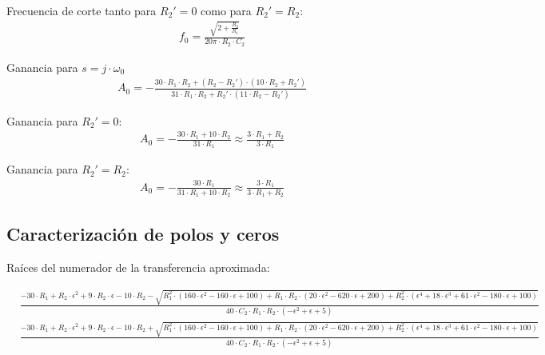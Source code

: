 Frecuencia de corte tanto para $R_2' = 0$ como para $R_2' = R_2$:
\begin{align}
    &f_0 = \frac{\sqrt{2 + \frac{R_2}{R_1}}}{20 \pi \cdot R_2 \cdot C_2}
    \label{eq:ej5_notch_frequency_limit_cases}
\end{align}

Ganancia para $s = j \cdot \omega_0$
\begin{align}
    &A_0 = - \frac{30 \cdot R_1 \cdot R_2 + \left(R_2 - R_2'\right) \cdot \left(10 \cdot R_2 + R_2'\right)}{31 \cdot R_1 \cdot R_2 + R_2' \cdot \left(11 \cdot R_2 - R_2'\right)}
    \label{eq:ej5_system_gain}
\end{align}

Ganancia para $R_2' = 0$:
\begin{align}
    &A_0 = - \frac{30 \cdot R_1 + 10 \cdot R_2}{31 \cdot R_1} \approx \frac{3 \cdot R_1 + R_2}{3 \cdot R_1}
    \label{eq:ej5_system_gain_for_R2'_0}
\end{align}

Ganancia para $R_2' = R_2$:
\begin{align}
    &A_0 = - \frac{30 \cdot R_1}{31 \cdot R_1 + 10 \cdot R_2} \approx \frac{3 \cdot R_1}{3 \cdot R_1 + R_2}
    \label{eq:ej5_system_gain_for_R2'_R2}
\end{align}



\subsection{Caracterización de polos y ceros}
Raíces del numerador de la transferencia aproximada:
\begin{ssmall}
\begin{align}
    &\frac{-30 \cdot R_1 + R_2 \cdot \epsilon^2 + 9 \cdot R_2 \cdot \epsilon - 10 \cdot R_2 - \sqrt{R_1^2 \cdot \left(160 \cdot \epsilon^2 - 160 \cdot \epsilon + 100\right) + R_1 \cdot R_2 \cdot \left(20 \cdot \epsilon^2 - 620 \cdot \epsilon + 200\right) + R_2^2 \cdot \left(\epsilon^4 + 18 \cdot \epsilon^3 + 61 \cdot \epsilon^2 - 180 \cdot \epsilon + 100\right)}}{40 \cdot C_2 \cdot R_1 \cdot R_2 \cdot (-\epsilon^2 + \epsilon + 5)} \\
    &\frac{-30 \cdot R_1 + R_2 \cdot \epsilon^2 + 9 \cdot R_2 \cdot \epsilon - 10 \cdot R_2 + \sqrt{R_1^2 \cdot \left(160 \cdot \epsilon^2 - 160 \cdot \epsilon + 100\right) + R_1 \cdot R_2 \cdot \left(20 \cdot \epsilon^2 - 620 \cdot \epsilon + 200\right) + R_2^2 \cdot \left(\epsilon^4 + 18 \cdot \epsilon^3 + 61 \cdot \epsilon^2 - 180 \cdot \epsilon + 100\right)}}{40 \cdot C_2 \cdot R_1 \cdot R_2 \cdot (-\epsilon^2 + \epsilon + 5)} 
    \label{eq:ej5_num_roots_simplyfied_system}
\end{align}
\end{ssmall}

